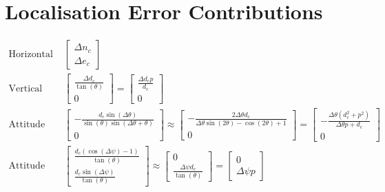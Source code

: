 \section{Localisation Error Contributions}
\begin{align*}
\text{Horizontal position error: }&\left[\begin{matrix}\Delta{n_c}\\\Delta{e_c}\end{matrix}\right] \\
\text{Vertical error: }&\left[\begin{matrix}\frac{\Delta{d_c}}{\tan{\left(\theta \right)}}\\0\end{matrix}\right] = \left[\begin{matrix}\frac{\Delta{d_c} p}{d_{c}}\\0\end{matrix}\right] \\
\text{Attitude pitch error: }&\left[\begin{matrix}- \frac{d_{c} \sin{\left(\Delta{\theta} \right)}}{\sin{\left(\theta \right)} \sin{\left(\Delta{\theta} + \theta \right)}}\\0\end{matrix}\right] \approx \left[\begin{matrix}- \frac{2 \Delta{\theta} d_{c}}{\Delta{\theta} \sin{\left(2 \theta \right)} - \cos{\left(2 \theta \right)} + 1}\\0\end{matrix}\right] = \left[\begin{matrix}- \frac{\Delta{\theta} \left(d_{c}^{2} + p^{2}\right)}{\Delta{\theta} p + d_{c}}\\0\end{matrix}\right] \\
\text{Attitude yaw error: }&\left[\begin{matrix}\frac{d_{c} \left(\cos{\left(\Delta{\psi} \right)} - 1\right)}{\tan{\left(\theta \right)}}\\\frac{d_{c} \sin{\left(\Delta{\psi} \right)}}{\tan{\left(\theta \right)}}\end{matrix}\right] \approx \left[\begin{matrix}0\\\frac{\Delta{\psi} d_{c}}{\tan{\left(\theta \right)}}\end{matrix}\right] = \left[\begin{matrix}0\\\Delta{\psi} p\end{matrix}\right] \\

\end{align*}
